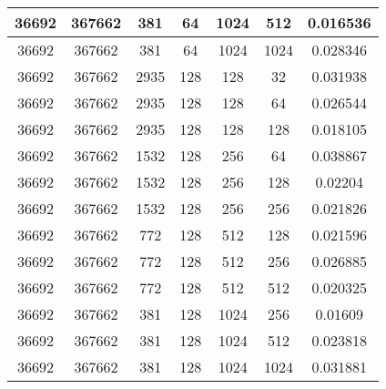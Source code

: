 \documentclass[9pt]{article}
\begin{document}
\begin{tabular}{|c|c|c|c|c|c|c| }
\hline
36692  & 367662  & 381  & 64  & 1024  & 512  & 0.016536 \\
\hline
36692  & 367662  & 381  & 64  & 1024  & 1024  & 0.028346 \\
\hline
36692  & 367662  & 2935  & 128  & 128  & 32  & 0.031938 \\
\hline
36692  & 367662  & 2935  & 128  & 128  & 64  & 0.026544 \\
\hline
36692  & 367662  & 2935  & 128  & 128  & 128  & 0.018105 \\
\hline
36692  & 367662  & 1532  & 128  & 256  & 64  & 0.038867 \\
\hline
36692  & 367662  & 1532  & 128  & 256  & 128  & 0.02204 \\
\hline
36692  & 367662  & 1532  & 128  & 256  & 256  & 0.021826 \\
\hline
36692  & 367662  & 772  & 128  & 512  & 128  & 0.021596 \\
\hline
36692  & 367662  & 772  & 128  & 512  & 256  & 0.026885 \\
\hline
36692  & 367662  & 772  & 128  & 512  & 512  & 0.020325 \\
\hline
36692  & 367662  & 381  & 128  & 1024  & 256  & 0.01609 \\
\hline
36692  & 367662  & 381  & 128  & 1024  & 512  & 0.023818 \\
\hline
36692  & 367662  & 381  & 128  & 1024  & 1024  & 0.031881 \\
\hline
\end{tabular}
 
\end{document}
